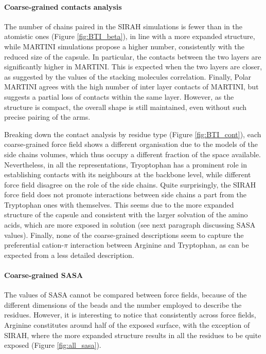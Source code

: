 \paragraph{Coarse-grained contacts analysis}
The number of chains paired in the SIRAH simulations is fewer than in the atomistic ones (Figure \ref{fig:BTI_beta}), in line with a more expanded structure, while MARTINI simulations propose a higher number, consistently with the reduced size of the capsule. In particular, the contacts between the two layers are significantly higher in MARTINI. This is expected when the two layers are closer, as suggested by the values of the stacking molecules correlation. Finally, Polar MARTINI agrees with the high number of inter layer contacts of MARTINI, but suggests a partial loss of contacts within the same layer. However, as the structure is compact, the overall shape is still maintained, even without such precise pairing of the arms.

Breaking down the contact analysis by residue type (Figure \ref{fig:BTI_cont}), each coarse-grained force field shows a different organisation due to the models of the side chains volumes, which thus occupy a different fraction of the space available.
%
Nevertheless, in all the representations, Tryoptophan has a prominent role in establishing contacts with its neighbours at the backbone level, while different force field disagree on the role of the side chains. Quite surprisingly, the SIRAH force field does not promote interactions between side chains a part from the Tryptophan ones with themselves. This seems due to the more expanded structure of the capsule and consistent with the larger solvation of the amino acids, which are more exposed in solution (see next paragraph discussing SASA values).
%
Finally, none of the coarse-grained descriptions seem to capture the preferential cation-$\pi$ interaction between Arginine and Tryptophan, as can be expected from a less detailed description.

\paragraph{Coarse-grained SASA} The values of SASA cannot be compared between force fields, because of the different dimensions of the beads and the number employed to describe the residues. However, it is interesting to notice that consistently across force fields, Arginine constitutes around half of the exposed surface, with the exception of SIRAH, where the more expanded structure results in all the residues to be quite exposed (Figure \ref{fig:all_sasa}).

